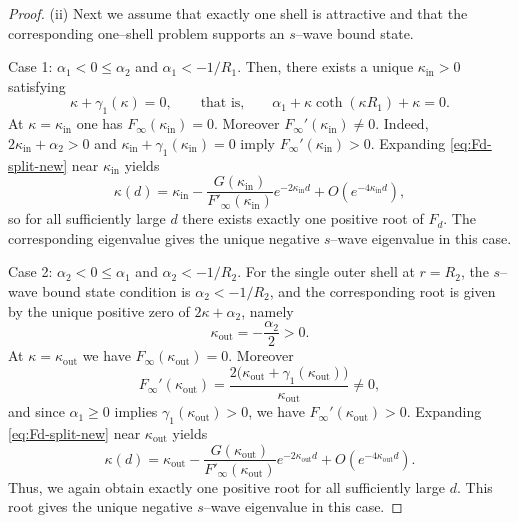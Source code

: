 \documentclass[10pt,a4paper]{amsart}
\begin{document}
\begin{proof}
\smallskip
\noindent
(ii) Next we assume that exactly one shell is attractive and that the
corresponding one--shell problem supports an $s$--wave bound state.

\smallskip
\noindent
Case 1: $\alpha_1<0\le\alpha_2$ and $\alpha_1<-1/R_1$.
Then, there exists a unique $\kappa_{\mathrm{in}}>0$ satisfying
$$
\kappa+\gamma_1(\kappa)=0,
\qquad\text{that is,}\qquad
\alpha_1+\kappa\coth(\kappa R_1)+\kappa=0.
$$
At $\kappa=\kappa_{\mathrm{in}}$ one has $F_\infty(\kappa_{\mathrm{in}})=0$.
Moreover $F_\infty'(\kappa_{\mathrm{in}})\ne0$.
Indeed, $2\kappa_{\mathrm{in}}+\alpha_2>0$ and
$\kappa_{\mathrm{in}}+\gamma_1(\kappa_{\mathrm{in}})=0$ imply
$F_\infty'(\kappa_{\mathrm{in}})>0$.
Expanding \eqref{eq:Fd-split-new} near $\kappa_{\mathrm{in}}$ yields
$$
\kappa(d)=\kappa_{\mathrm{in}}
-\frac{G(\kappa_{\mathrm{in}})}{F'_\infty(\kappa_{\mathrm{in}})}e^{-2\kappa_{\mathrm{in}}d}
+O(e^{-4\kappa_{\mathrm{in}}d}),
$$
so for all sufficiently large $d$ there exists exactly one positive root of
$F_d$.
The corresponding eigenvalue gives the unique negative $s$--wave eigenvalue in
this case.

\smallskip
\noindent
Case 2: $\alpha_2<0\le\alpha_1$ and $\alpha_2<-1/R_2$.
For the single outer shell at $r=R_2$, the $s$--wave bound state condition is
$\alpha_2<-1/R_2$, and the corresponding root is given by the unique positive
zero of $2\kappa+\alpha_2$, namely
$$
\kappa_{\mathrm{out}}=-\frac{\alpha_2}{2}>0.
$$
At $\kappa=\kappa_{\mathrm{out}}$ we have $F_\infty(\kappa_{\mathrm{out}})=0$.
Moreover
$$
F_\infty'(\kappa_{\mathrm{out}})
=\frac{2\bigl(\kappa_{\mathrm{out}}+\gamma_1(\kappa_{\mathrm{out}})\bigr)}{\kappa_{\mathrm{out}}}
\ne0,
$$
and since $\alpha_1\ge0$ implies $\gamma_1(\kappa_{\mathrm{out}})>0$, we have
$F_\infty'(\kappa_{\mathrm{out}})>0$.
Expanding \eqref{eq:Fd-split-new} near $\kappa_{\mathrm{out}}$ yields
$$
\kappa(d)=\kappa_{\mathrm{out}}
-\frac{G(\kappa_{\mathrm{out}})}{F'_\infty(\kappa_{\mathrm{out}})}e^{-2\kappa_{\mathrm{out}}d}
+O(e^{-4\kappa_{\mathrm{out}}d}).
$$
Thus, we again obtain exactly one positive root for all sufficiently large $d$.
This root gives the unique negative $s$--wave eigenvalue in this case.


\end{proof}
\end{document}
